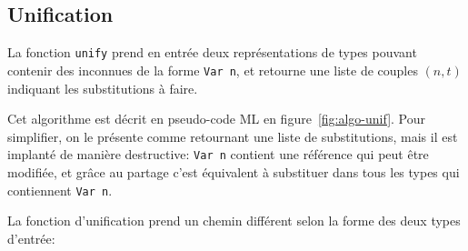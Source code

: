 \subsection*{Unification}

La fonction \texttt{unify} prend en entrée deux représentations de types pouvant
contenir des inconnues de la forme \texttt{Var n}, et retourne une liste de
couples $(n, t)$ indiquant les substitutions à faire.

Cet algorithme est décrit en pseudo-code ML en figure~\ref{fig:algo-unif}. Pour
simplifier, on le présente comme retournant une liste de substitutions, mais il
est implanté de manière destructive: \texttt{Var n} contient une référence qui
peut être modifiée, et grâce au partage c'est équivalent à substituer dans tous
les types qui contiennent \texttt{Var n}.

La fonction d'unification prend un chemin différent selon la forme des deux
types d'entrée:


